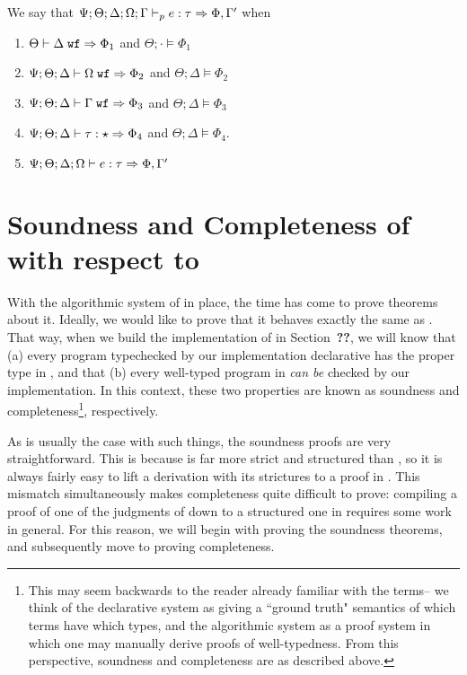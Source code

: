 \begin{definition}
We say that $\Psi ; \Theta ; \Delta ; \Omega ; \Gamma \vdash_p e : \tau \Rightarrow \Phi,\Gamma'$ when
\begin{enumerate}
  \item $\Theta \vdash \Delta \; \texttt{wf} \Rightarrow \Phi_1$ and $\Theta ; \cdot \vDash \Phi_1$
  \item $\Psi ; \Theta ; \Delta \vdash \Omega \; \texttt{wf} \Rightarrow \Phi_2$ and $\Theta ; \Delta \vDash \Phi_2$
  \item $\Psi ; \Theta ; \Delta \vdash \Gamma \; \texttt{wf} \Rightarrow \Phi_3$ and $\Theta ; \Delta \vDash \Phi_3$
  \item $\Psi ; \Theta ; \Delta \vdash \tau : \star \Rightarrow \Phi_4$ and $\Theta ; \Delta \vDash \Phi_4$.
  \item $\Psi ; \Theta ; \Delta ; \Omega \vdash e : \tau \Rightarrow \Phi,\Gamma'$
\end{enumerate}
\end{definition}


\section{Soundness and Completeness of \bilambdaamor with respect to \dlambdaamor}
\label{sec:metatheory}
With the algorithmic system of \bilambdaamor in place, the time has come to prove theorems about it. Ideally, we would like to prove that it behaves exactly the same as \dlambdaamor. That way, when we build the implementation of \bilambdaamor in Section~\textbf{??}, we will know that (a) every program typechecked by our implementation declarative has the proper type in \dlambdaamor, and that (b) every well-typed program in \dlambdaamor \textit{can be} checked by our implementation. In this context, these two properties are known as soundness and completeness\footnote{
This may seem backwards to the reader already familiar with the terms-- we think of the declarative system as giving a ``ground truth" semantics of which terms have which types, and the algorithmic system as a proof system in which one may manually derive proofs of well-typedness. From this perspective, soundness and completeness are as described above.
}, respectively.

As is usually the case with such things, the soundness proofs are very straightforward. This is because \bilambdaamor is far more strict and structured than \dlambdaamor, so it is always fairly easy to lift a \bilambdaamor derivation with its strictures to a proof in \dlambdaamor. This mismatch simultaneously makes completeness quite difficult to prove: compiling a proof of one of the judgments of \dlambdaamor down to a structured one in \bilambdaamor requires some work in general. For this reason, we will begin with proving the soundness theorems, and subsequently move to proving completeness.

